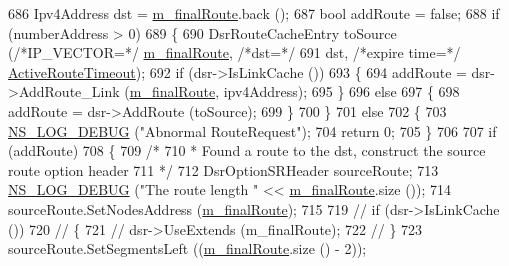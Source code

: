 \begin{DoxyCode}
686               Ipv4Address dst = \hyperlink{classns3_1_1dsr_1_1DsrOptions_a3fe6a72ebaae73724ce63383635b7af8}{m\_finalRoute}.back ();
687               \textcolor{keywordtype}{bool} addRoute = \textcolor{keyword}{false};
688               \textcolor{keywordflow}{if} (numberAddress > 0)
689                 \{
690                   DsrRouteCacheEntry toSource (\textcolor{comment}{/*IP\_VECTOR=*/} \hyperlink{classns3_1_1dsr_1_1DsrOptions_a3fe6a72ebaae73724ce63383635b7af8}{m\_finalRoute}, \textcolor{comment}{/*dst=*/}
691                                                            dst, \textcolor{comment}{/*expire time=*/} 
      \hyperlink{classns3_1_1dsr_1_1DsrOptions_a2d111e83b3c91f18ea49478a35ebb119}{ActiveRouteTimeout});
692                   \textcolor{keywordflow}{if} (dsr->IsLinkCache ())
693                     \{
694                       addRoute = dsr->AddRoute\_Link (\hyperlink{classns3_1_1dsr_1_1DsrOptions_a3fe6a72ebaae73724ce63383635b7af8}{m\_finalRoute}, ipv4Address);
695                     \}
696                   \textcolor{keywordflow}{else}
697                     \{
698                       addRoute = dsr->AddRoute (toSource);
699                     \}
700                 \}
701               \textcolor{keywordflow}{else}
702                 \{
703                   \hyperlink{group__logging_ga413f1886406d49f59a6a0a89b77b4d0a}{NS\_LOG\_DEBUG} (\textcolor{stringliteral}{"Abnormal RouteRequest"});
704                   \textcolor{keywordflow}{return} 0;
705                 \}
706 
707               \textcolor{keywordflow}{if} (addRoute)
708                 \{
709                   \textcolor{comment}{/*}
710 \textcolor{comment}{                   * Found a route to the dst, construct the source route option header}
711 \textcolor{comment}{                   */}
712                   DsrOptionSRHeader sourceRoute;
713                   \hyperlink{group__logging_ga413f1886406d49f59a6a0a89b77b4d0a}{NS\_LOG\_DEBUG} (\textcolor{stringliteral}{"The route length "} << \hyperlink{classns3_1_1dsr_1_1DsrOptions_a3fe6a72ebaae73724ce63383635b7af8}{m\_finalRoute}.size ());
714                   sourceRoute.SetNodesAddress (\hyperlink{classns3_1_1dsr_1_1DsrOptions_a3fe6a72ebaae73724ce63383635b7af8}{m\_finalRoute});
715 
719                   \textcolor{comment}{// if (dsr->IsLinkCache ())}
720                   \textcolor{comment}{//   \{}
721                   \textcolor{comment}{//     dsr->UseExtends (m\_finalRoute);}
722                   \textcolor{comment}{//   \}}
723                   sourceRoute.SetSegmentsLeft ((\hyperlink{classns3_1_1dsr_1_1DsrOptions_a3fe6a72ebaae73724ce63383635b7af8}{m\_finalRoute}.size () - 2));

\end{DoxyCode}
